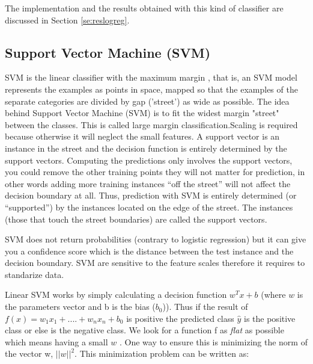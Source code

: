\documentclass[11pt]{article}
\theoremstyle{definition}
\theoremstyle{remark}
\begin{document}
{%

The implementation and the results obtained with this kind of classifier are discussed in Section \ref{se:reslogreg}.

\subsection{Support Vector Machine (SVM)}
\label{sse:svm}
SVM is the linear classifier with the maximum margin \cite{vapnik2013nature}, that is, an SVM model represents the examples as points in space, mapped so that the examples of the separate categories are divided by gap ('street') as wide as possible.
The idea behind Support Vector Machine (SVM) is to fit the widest margin "street" between the classes. This is called large margin classification.Scaling is required because otherwise it will neglect the small features.
A support vector is an instance in the street and the decision function is entirely determined by the support vectors. Computing the predictions only involves the support vectors, you could remove the other training points they will not matter for prediction, in other words adding more training instances “off the street” will not affect the decision boundary at all. Thus, prediction with SVM is entirely determined (or “supported”) by the instances located on the edge of the street. The instances (those that touch the street boundaries) are called the support vectors. 

SVM does not return probabilities (contrary to logistic regression) but it can give you a confidence score which is the distance between the test instance and the decision boundary. SVM are sensitive to the feature scales therefore it requires to standarize data. 

Linear SVM works by simply calculating a decision function $w^Tx +b$ (where $w$ is the parameters vector and b is the bias ($b_0$)). Thus if the result of $f(x) = w_{1} x_{1} + ....+ w_{n}x_{n} + b_0$ is positive the predicted class $\hat{y}$ is the positive class or else is the negative class. We look for a function f as \emph{flat} as possible which means having a small $w$ . One way to ensure this is minimizing the norm of the vector w, $||w||^2$. This minimization problem can be written as:

}
\end{document}
